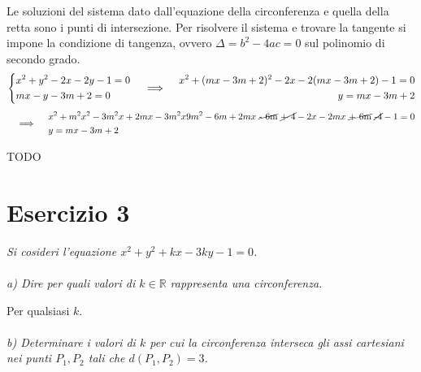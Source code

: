 \documentclass[a4paper]{article}
\begin{document}
        Le soluzioni del sistema dato dall'equazione della circonferenza e quella della retta
        sono i punti di intersezione. Per risolvere il sistema e trovare la tangente si impone
        la condizione di tangenza, ovvero $\Delta = b^2 - 4ac = 0$ sul polinomio di secondo grado.
        \[
                \begin{dcases}
                        x^2 + y^2 - 2x -2y - 1 = 0 \\
                        mx -y -3m + 2 = 0
                \end{dcases} \quad \implies \quad
                \begin{aligned}
                        x^2 + (mx -3m + 2)^2 - 2x -2(mx -3m + 2) - 1 = 0 \\
                        y = mx -3m + 2
                \end{aligned}
        \]
        \[
                \quad \implies \quad
                \begin{aligned}
                        & x^2 + m^2x^2 - 3m^2x + 2mx - 3m^2x 9m^2 - 6m + 2mx \mbox{ \cancel{- 6m}} \mbox{ \cancel{+ 4}} - 2x -2mx \mbox{ \cancel{+ 6m}} \mbox{ \cancel{-4}} - 1 = 0 \\
                        & y = mx -3m + 2
                \end{aligned}
        \]

        TODO

        \newpage


        \section*{Esercizio 3}
        \textsl{
                Si cosideri l'equazione $x^2 + y^2 + kx -3ky - 1 = 0$.
        }

        \paragraph{}
        \textsl{
                a) Dire per quali valori di $k \in \mathbb{R}$ rappresenta una circonferenza.
        }

        Per qualsiasi $k$.

        \paragraph{}
        \textsl{
                b) Determinare i valori di $k$ per cui la circonferenza interseca gli assi cartesiani nei punti $P_1,P_2$ tali che $d(P_1,P_2) = 3$.
        }
\end{document}
